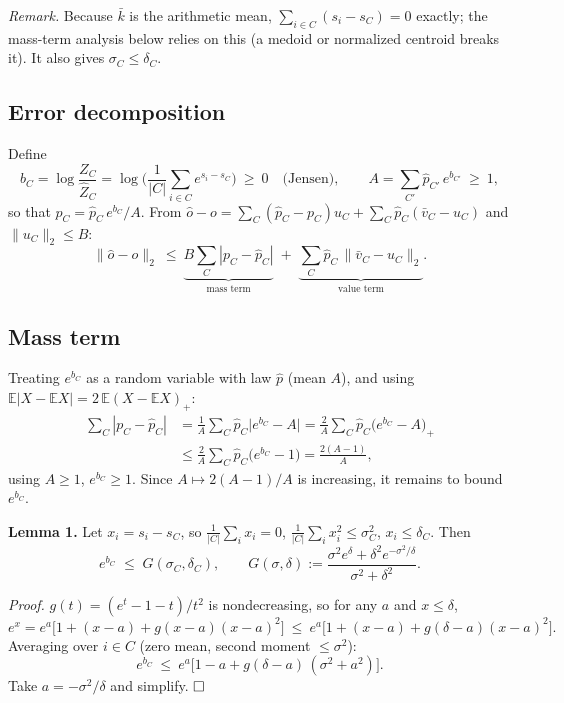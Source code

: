 \emph{Remark.} Because $\bar k$ is the arithmetic mean,
$\sum_{i\in C}(s_i - s_C) = 0$ exactly; the mass-term analysis below relies on this
(a medoid or normalized centroid breaks it). It also gives $\sigma_C \le \delta_C$.

\subsection{Error decomposition}

Define
\[
b_C = \log \frac{Z_C}{\hat Z_C}
    = \log\Big(\frac{1}{|C|}\sum_{i\in C} e^{s_i - s_C}\Big) \ \ge\ 0
\quad\text{(Jensen)},
\qquad
A = \sum_{C'} \hat p_{C'}\, e^{b_{C'}} \ \ge\ 1,
\]
so that $p_C = \hat p_C\, e^{b_C} / A$. From
$\hat o - o = \sum_C (\hat p_C - p_C) u_C + \sum_C \hat p_C (\bar v_C - u_C)$
and $\|u_C\|_2 \le B$:
\[
\|\hat o - o\|_2
\ \le\
\underbrace{B \sum_C |p_C - \hat p_C|}_{\text{mass term}}
\; + \;
\underbrace{\sum_C \hat p_C\, \|\bar v_C - u_C\|_2}_{\text{value term}} .
\]

\subsection{Mass term}

Treating $e^{b_C}$ as a random variable with law $\hat p$ (mean $A$), and using
$\mathbb E|X - \mathbb E X| = 2\,\mathbb E (X - \mathbb E X)_+$:
\begin{align*}
\sum_C |p_C - \hat p_C|
  &= \frac{1}{A} \sum_C \hat p_C \big| e^{b_C} - A \big|
   = \frac{2}{A} \sum_C \hat p_C \big( e^{b_C} - A \big)_+ \\
  &\le \frac{2}{A} \sum_C \hat p_C \big( e^{b_C} - 1 \big)
   = \frac{2(A-1)}{A},
\end{align*}
using $A \ge 1$, $e^{b_C} \ge 1$. Since $A \mapsto 2(A-1)/A$ is increasing, it remains
to bound $e^{b_C}$.

\begin{tcolorbox}[colback=white, colframe=black, arc=0mm, boxrule=0.5pt]
\textbf{Lemma 1.} Let $x_i = s_i - s_C$, so $\frac{1}{|C|}\sum_i x_i = 0$,
$\frac{1}{|C|}\sum_i x_i^2 \le \sigma_C^2$, $x_i \le \delta_C$. Then
\[
e^{b_C} \;\le\; G(\sigma_C, \delta_C),
\qquad
G(\sigma,\delta) := \frac{\sigma^2 e^{\delta} + \delta^2 e^{-\sigma^2/\delta}}
                         {\sigma^2 + \delta^2} .
\]
\end{tcolorbox}

\emph{Proof.} $g(t) = (e^t - 1 - t)/t^2$ is nondecreasing, so for any $a$ and
$x \le \delta$,
\[
e^{x} = e^{a}\big[1 + (x-a) + g(x-a)(x-a)^2\big]
\ \le\ e^{a}\big[1 + (x-a) + g(\delta-a)(x-a)^2\big].
\]
Averaging over $i \in C$ (zero mean, second moment $\le \sigma^2$):
\[
e^{b_C} \ \le\ e^{a}\big[1 - a + g(\delta-a)\,(\sigma^2 + a^2)\big].
\]
Take $a = -\sigma^2/\delta$ and simplify. $\hfill\square$

